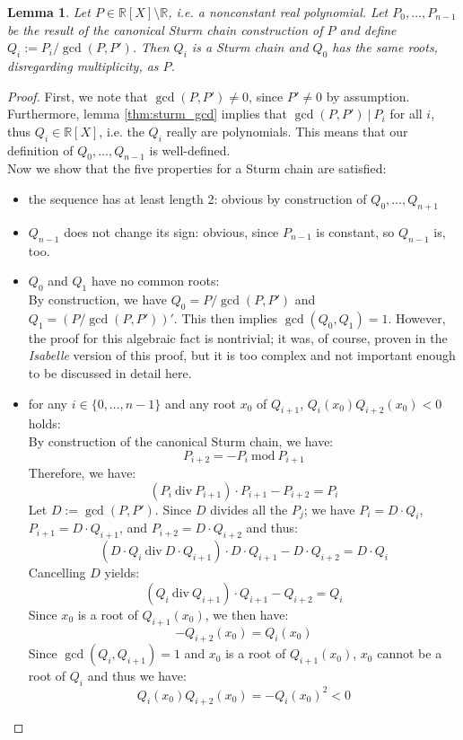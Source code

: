 \documentclass[11pt,a4paper,oneside]{article}
\newtheorem{lemma}[definition]{Lemma}
\newcommand{\RR}{\mathbb{R}}
\begin{document}
\begin{lemma}\label{thm:sturm_multiple_aux}
Let $P\in\RR[X]\setminus\RR$, i.e. a nonconstant real polynomial. Let $P_0,\ldots,P_{n-1}$ be the result of the canonical Sturm chain construction of $P$ and define $Q_i := P_i / \gcd(P,P')$. Then $Q_i$ is a Sturm chain and $Q_0$ has the same roots, disregarding multiplicity, as $P$.
\end{lemma}
\begin{proof}
First, we note that $\gcd(P,P')\neq 0$, since $P'\neq 0$ by assumption. Furthermore, lemma \ref{thm:sturm_gcd} implies that $\gcd(P,P')\ |\ P_i$ for all $i$, thus $Q_i\in\RR[X]$, i.e. the $Q_i$ really are polynomials. This means that our definition of $Q_0,\ldots,Q_{n-1}$ is well-defined.\\
Now we show that the five properties for a Sturm chain are satisfied:
\begin{itemize}
\item the sequence has at least length 2: obvious by construction of $Q_0, \ldots, Q_{n+1}$
\item $Q_{n-1}$ does not change its sign: obvious, since $P_{n-1}$ is constant, so $Q_{n-1}$ is, too.
\item $Q_0$ and $Q_1$ have no common roots:\\
By construction, we have $Q_0 = P / \gcd(P,P')$ and $Q_1 = (P / \gcd(P, P'))'$. This then implies $\gcd(Q_0, Q_1) = 1$. However, the proof for this algebraic fact is nontrivial; it was, of course, proven in the \emph{Isabelle} version of this proof, but it is too complex and not important enough to be discussed in detail here.
\item for any $i\in\{0,\ldots,n-1\}$ and any root $x_0$ of $Q_{i+1}$, $Q_{i}(x_0)Q_{i+2}(x_0) < 0$ holds:\\
By construction of the canonical Sturm chain, we have:
$$P_{i+2} = -P_{i}\ \mathrm{mod}\ P_{i+1}$$
Therefore, we have:
$$(P_{i}\ \mathrm{div}\ P_{i+1}) \cdot P_{i+1} - P_{i+2} = P_{i}$$
Let $D:=\gcd(P,P')$. Since $D$ divides all the $P_j$; we have $P_{i}=D\cdot Q_{i}$, $P_{i+1}=D\cdot Q_{i+1}$, and $P_{i+2}=D\cdot Q_{i+2}$ and thus:
$$(D\cdot Q_{i}\ \mathrm{div}\ D\cdot Q_{i+1}) \cdot D\cdot Q_{i+1} - D\cdot Q_{i+2} = D\cdot Q_{i}$$
Cancelling $D$ yields:
$$(Q_{i}\ \mathrm{div}\ Q_{i+1}) \cdot Q_{i+1} - Q_{i+2} = Q_{i}$$
Since $x_0$ is a root of $Q_{i+1}(x_0)$, we then have:
$$-Q_{i+2}(x_0) = Q_{i}(x_0)$$
Since $\gcd(Q_{i}, Q_{i+1}) = 1$ and $x_0$ is a root of $Q_{i+1}(x_0)$, $x_0$ cannot be a root of $Q_{i}$ and thus we have:
$$Q_{i}(x_0)Q_{i+2}(x_0) = -Q_{i}(x_0)^2 < 0$$


\end{itemize}
\end{proof}
\end{document}

